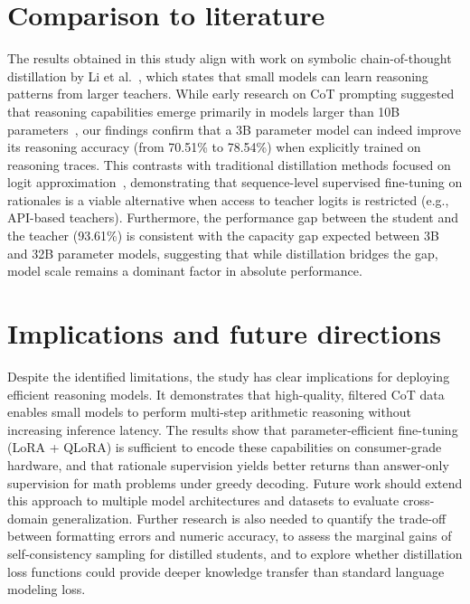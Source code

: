 \section{Comparison to literature}
The results obtained in this study align with work on symbolic chain-of-thought distillation by Li et al.~\cite{li2024symbolicchainofthoughtdistillationsmall}, which states that small models can learn reasoning patterns from larger teachers. While early research on CoT prompting suggested that reasoning capabilities emerge primarily in models larger than 10B parameters~\cite{wei2023chainofthoughtpromptingelicitsreasoning}, our findings confirm that a 3B parameter model can indeed improve its reasoning accuracy (from 70.51\% to 78.54\%) when explicitly trained on reasoning traces. This contrasts with traditional distillation methods focused on logit approximation~\cite{hinton2015distilling,gou2021knowledge}, demonstrating that sequence-level supervised fine-tuning on rationales is a viable alternative when access to teacher logits is restricted (e.g., API-based teachers). Furthermore, the performance gap between the student and the teacher (93.61\%) is consistent with the capacity gap expected between 3B and 32B parameter models, suggesting that while distillation bridges the gap, model scale remains a dominant factor in absolute performance.

\section{Implications and future directions}
Despite the identified limitations, the study has clear implications for deploying efficient reasoning models. It demonstrates that high-quality, filtered CoT data enables small models to perform multi-step arithmetic reasoning without increasing inference latency. The results show that parameter-efficient fine-tuning (LoRA + QLoRA) is sufficient to encode these capabilities on consumer-grade hardware, and that rationale supervision yields better returns than answer-only supervision for math problems under greedy decoding. Future work should extend this approach to multiple model architectures and datasets to evaluate cross-domain generalization. Further research is also needed to quantify the trade-off between formatting errors and numeric accuracy, to assess the marginal gains of self-consistency sampling for distilled students, and to explore whether distillation loss functions could provide deeper knowledge transfer than standard language modeling loss.
